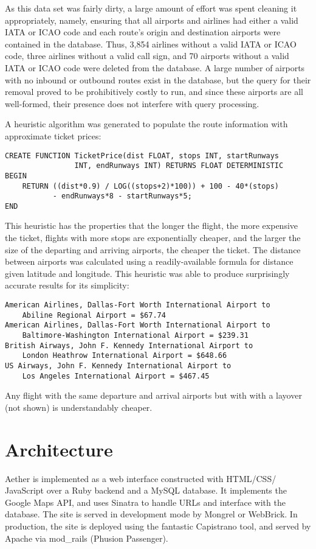 \indent As this data set was fairly dirty, a large amount of effort was spent cleaning it appropriately, namely, ensuring that all airports and airlines had either a valid IATA or ICAO code and each route's origin and destination airports were contained in the database. Thus, 3,854 airlines without a valid IATA or ICAO code, three airlines without a valid call sign, and 70 airports without a valid IATA or ICAO code were deleted from the database. A large number of airports with no inbound or outbound routes exist in the database, but the query for their removal proved to be prohibitively costly to run, and since these airports are all well-formed, their presence does not interfere with query processing.
	
\indent A heuristic algorithm was generated to populate the route information with approximate ticket prices: 
\begin{verbatim}
CREATE FUNCTION TicketPrice(dist FLOAT, stops INT, startRunways
                INT, endRunways INT) RETURNS FLOAT DETERMINISTIC
BEGIN
    RETURN ((dist*0.9) / LOG((stops+2)*100)) + 100 - 40*(stops)
           - endRunways*8 - startRunways*5;
END
\end{verbatim}
This heuristic has the properties that the longer the flight, the more expensive the ticket, flights with more stops are exponentially cheaper, and the larger the size of the departing and arriving airports, the cheaper the ticket. The distance between airports was calculated using a readily-available formula for distance given latitude and longitude. This heuristic was able to produce surprisingly accurate results for its simplicity:
\begin{verbatim}
American Airlines, Dallas-Fort Worth International Airport to
    Abiline Regional Airport = $67.74 
American Airlines, Dallas-Fort Worth International Airport to
    Baltimore-Washington International Airport = $239.31
British Airways, John F. Kennedy International Airport to
    London Heathrow International Airport = $648.66
US Airways, John F. Kennedy International Airport to 
    Los Angeles International Airport = $467.45
\end{verbatim}
Any flight with the same departure and arrival airports but with with a layover (not shown) is understandably cheaper.

\section{Architecture}
Aether is implemented as a web interface constructed with HTML/CSS/
JavaScript over a Ruby backend and a MySQL database. It implements the Google Maps API, and uses Sinatra to handle URLs and interface with the database. The site is served in development mode by Mongrel or WebBrick. In production, the site is deployed using the fantastic Capistrano tool, and served by Apache via mod\_rails (Phusion Passenger).

